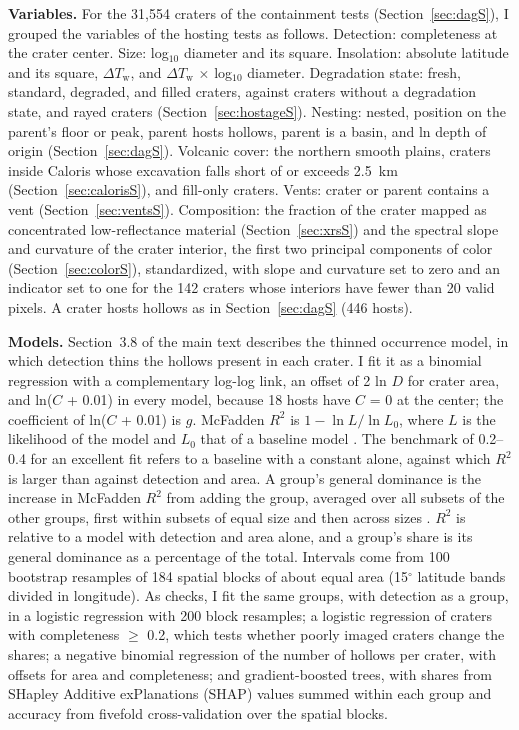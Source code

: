 \documentclass{planetary}
\begin{document}
\textbf{Variables.} For the 31,554 craters of the containment tests (Section~\ref{sec:dagS}), I grouped the variables of the hosting tests as follows. Detection: completeness at the crater center. Size: log$_{10}$ diameter and its square. Insolation: absolute latitude and its square, $\Delta T_\mathrm{w}$, and $\Delta T_\mathrm{w}$ $\times$ log$_{10}$ diameter. Degradation state: fresh, standard, degraded, and filled craters, against craters without a degradation state, and rayed craters (Section~\ref{sec:hostageS}). Nesting: nested, position on the parent's floor or peak, parent hosts hollows, parent is a basin, and ln depth of origin (Section~\ref{sec:dagS}). Volcanic cover: the northern smooth plains, craters inside Caloris whose excavation falls short of or exceeds 2.5~km (Section~\ref{sec:calorisS}), and fill-only craters. Vents: crater or parent contains a vent (Section~\ref{sec:ventsS}). Composition: the fraction of the crater mapped as concentrated low-reflectance material (Section~\ref{sec:xrsS}) and the spectral slope and curvature of the crater interior, the first two principal components of color (Section~\ref{sec:colorS}), standardized, with slope and curvature set to zero and an indicator set to one for the 142 craters whose interiors have fewer than 20 valid pixels. A crater hosts hollows as in Section~\ref{sec:dagS} (446 hosts).

\textbf{Models.} Section~3.8 of the main text describes the thinned occurrence model, in which detection thins the hollows present in each crater. I fit it as a binomial regression with a complementary log-log link, an offset of 2 ln $D$ for crater area, and ln($C$ + 0.01) in every model, because 18 hosts have $C$ = 0 at the center; the coefficient of ln($C$ + 0.01) is $g$. McFadden $R^2$ is $1 - \ln L/\ln L_0$, where $L$ is the likelihood of the model and $L_0$ that of a baseline model \parencite{mcfadden1974}. The benchmark of 0.2--0.4 for an excellent fit \parencite{mcfadden1977} refers to a baseline with a constant alone, against which $R^2$ is larger than against detection and area. A group's general dominance is the increase in McFadden $R^2$ from adding the group, averaged over all subsets of the other groups, first within subsets of equal size and then across sizes \parencite{azen2003,azen2009}. $R^2$ is relative to a model with detection and area alone, and a group's share is its general dominance as a percentage of the total. Intervals come from 100 bootstrap resamples of 184 spatial blocks of about equal area (15$^\circ$ latitude bands divided in longitude). As checks, I fit the same groups, with detection as a group, in a logistic regression with 200 block resamples; a logistic regression of craters with completeness $\geq$ 0.2, which tests whether poorly imaged craters change the shares; a negative binomial regression of the number of hollows per crater, with offsets for area and completeness; and gradient-boosted trees, with shares from SHapley Additive exPlanations (SHAP) values summed within each group and accuracy from fivefold cross-validation over the spatial blocks.
\end{document}
